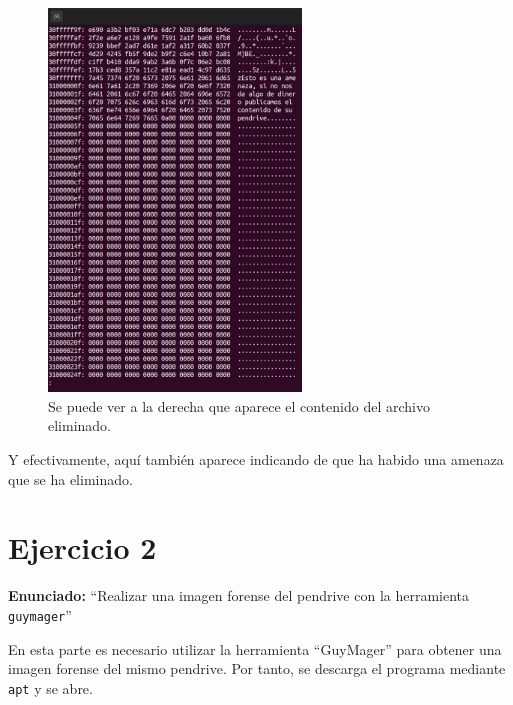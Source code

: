 \documentclass{article}
\begin{document}
\begin{figure}[H]
    \centering
    \includegraphics[width=0.6\textwidth]{imagenes/Captura desde 2022-12-03 21-39-24.png}
    \caption{Se puede ver a la derecha que aparece el contenido del archivo eliminado.}
\end{figure}

Y efectivamente, aquí también aparece indicando de que ha habido una amenaza que se ha eliminado.

\newpage

{}
\section*{Ejercicio 2}

\textbf{Enunciado: }``Realizar una imagen forense del  pendrive con la herramienta \verb|guymager|''

\bigskip

En esta parte es necesario utilizar la herramienta ``GuyMager'' para obtener una imagen forense del mismo pendrive. Por tanto, se descarga el programa mediante \verb|apt| y se abre.
\end{document}
